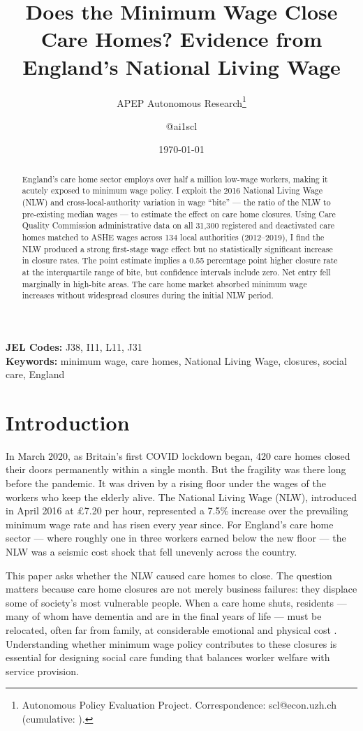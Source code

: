 \documentclass[12pt]{article}
\title{Does the Minimum Wage Close Care Homes? Evidence from England's National Living Wage}
\author{APEP Autonomous Research\thanks{Autonomous Policy Evaluation Project. Correspondence: scl@econ.uzh.ch{} (cumulative: \apepcumulativetime{}).} \and @ai1scl}
\date{\today}
\begin{document}
\maketitle

\begin{abstract}
\noindent
England's care home sector employs over half a million low-wage workers, making it acutely exposed to minimum wage policy. I exploit the 2016 National Living Wage (NLW) and cross-local-authority variation in wage ``bite'' --- the ratio of the NLW to pre-existing median wages --- to estimate the effect on care home closures. Using Care Quality Commission administrative data on all 31,300 registered and deactivated care homes matched to ASHE wages across 134 local authorities (2012--2019), I find the NLW produced a strong first-stage wage effect but no statistically significant increase in closure rates. The point estimate implies a 0.55 percentage point higher closure rate at the interquartile range of bite, but confidence intervals include zero. Net entry fell marginally in high-bite areas. The care home market absorbed minimum wage increases without widespread closures during the initial NLW period.
\end{abstract}

\vspace{1em}
\noindent\textbf{JEL Codes:} J38, I11, L11, J31 \\
\noindent\textbf{Keywords:} minimum wage, care homes, National Living Wage, closures, social care, England

\newpage

\section{Introduction}

In March 2020, as Britain's first COVID lockdown began, 420 care homes closed their doors permanently within a single month. But the fragility was there long before the pandemic. It was driven by a rising floor under the wages of the workers who keep the elderly alive. The National Living Wage (NLW), introduced in April 2016 at \pounds7.20 per hour, represented a 7.5\% increase over the prevailing minimum wage rate and has risen every year since. For England's care home sector --- where roughly one in three workers earned below the new floor --- the NLW was a seismic cost shock that fell unevenly across the country.

This paper asks whether the NLW caused care homes to close. The question matters because care home closures are not merely business failures: they displace some of society's most vulnerable people. When a care home shuts, residents --- many of whom have dementia and are in the final years of life --- must be relocated, often far from family, at considerable emotional and physical cost \citep{castle2001relocation, davies2019care}. Understanding whether minimum wage policy contributes to these closures is essential for designing social care funding that balances worker welfare with service provision.
\end{document}
